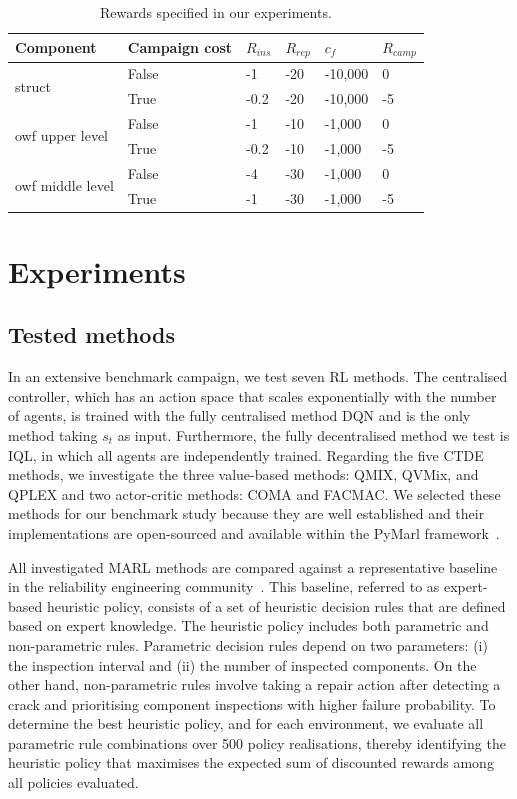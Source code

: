 \begin{table}
\centering
\caption{Rewards specified in our experiments.}
\label{tab:rewards_det}
\begin{tabular}{llllll}
\toprule
Component & Campaign cost & $R_{ins}$ & $R_{rep}$ &  $c_f$ & $R_{camp}$ \\
\bottomrule
\multirow{2}{*}{struct} &  False & -1 & -20 & -10,000 & 0  \\ 
& True & -0.2 & -20 & -10,000 & -5   \\
\bottomrule
\multirow{2}{*}{owf upper level} & False & -1 & -10 & -1,000 & 0     \\
& True  & -0.2 & -10 & -1,000 & -5     \\
\multirow{2}{*}{owf middle level} & False & -4 & -30 & -1,000 & 0    \\
& True & -1 & -30 & -1,000 & -5    \\
\bottomrule
\end{tabular}
\end{table}


\section{Experiments}\label{sec:ch5_experiments}
\subsection{Tested methods}
\label{sec:tested_method}
In an extensive benchmark campaign, we test seven RL methods.
The centralised controller, which has an action space that scales exponentially with the number of agents, is trained with the fully centralised method DQN and is the only method taking $s_t$ as input.
Furthermore, the fully decentralised method we test is IQL, in which all agents are independently trained.
Regarding the five CTDE methods, we investigate the three value-based methods: QMIX, QVMix, and QPLEX and two actor-critic methods: COMA and FACMAC.
We selected these methods for our benchmark study because they are well established and their implementations are open-sourced and available within the PyMarl framework~\citep{samvelyan2019starcraft}.

All investigated MARL methods are compared against a representative baseline in the reliability engineering community~\citep{LuqueDBN2019,morato2022syst}.
This baseline, referred to as expert-based heuristic policy, consists of a set of heuristic decision rules that are defined based on expert knowledge.
The heuristic policy includes both parametric and non-parametric rules.
Parametric decision rules depend on two parameters: (i) the inspection interval and (ii) the number of inspected components.
On the other hand, non-parametric rules involve taking a repair action after detecting a crack and prioritising component inspections with higher failure probability.
To determine the best heuristic policy, and for each environment, we evaluate all parametric rule combinations over 500 policy realisations, thereby identifying the heuristic policy that maximises the expected sum of discounted rewards among all policies evaluated.


